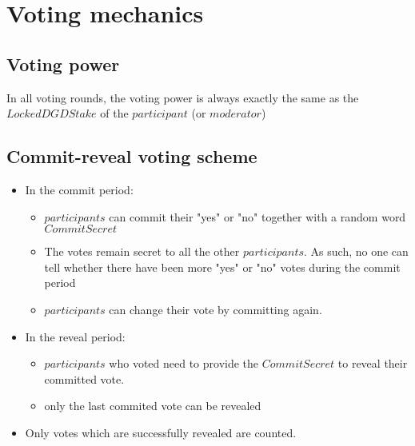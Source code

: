 \documentclass[11pt,a4paper,titlepage]{article}
\begin{document}
\section{Voting mechanics}{
	\subsection{Voting power} {
		In all voting rounds, the voting power is always exactly the same as the $Locked DGD Stake$ of the $participant$ (or $moderator$)
	}
	\subsection{Commit-reveal voting scheme}{
		\begin{itemize}
			\item In the commit period:
			\begin{itemize}
				\item $participants$ can commit their "yes" or "no" together with a random word $CommitSecret$
				\item The votes remain secret to all the other $participants$. As such, no one can tell whether there have been more "yes" or "no" votes during the commit period
				\item $participants$ can change their vote by committing again.
			\end{itemize}
			\item In the reveal period:
			\begin{itemize}
				\item $participants$ who voted need to provide the $CommitSecret$ to reveal their committed vote.
				\item only the last commited vote can be revealed
			\end{itemize}
			\item Only votes which are successfully revealed are counted.
		\end{itemize}
	}

}
\end{document}
